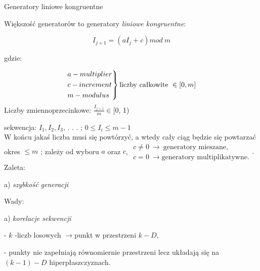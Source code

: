     \begin{frame}{Generatory liniowe kongruentne}

	Większość generatorów to generatory {\it liniowe kongruentne}:
	\begin{center}
 	$$I_{j+1} = (aI_{j}+c) mod\ m$$
	\end{center}
	gdzie:

    \[
    {\begin{rcases*}
	a - multiplier\\
	c - increment\\
	m - modulus
    \end{rcases*} \text{liczby całkowite} \ \in [0,m]}
    \]
    Liczby zmiennoprzecinkowe: $\displaystyle \frac{I_{j+1}}{m}\in[0$, 1)
    \newline
	\end{frame}
    \begin{frame}
	sekwencja: $I_{1}, I_{2}, I_{3}$, . . . ; $0\leq I_{i}\leq m-1$\\
	W końcu jakaś liczba musi się powtórzyć, a wtedy cały ciąg będzie się powtarzać\\
    okres $\leq m$ ; zależy od wyboru $a$ oraz  $c$, 
    $\begin{array}{l}
	c\neq 0\ \rightarrow\ \text{generatory mieszane},\\
	c=0\ \rightarrow \text{generatory multiplikatywne.}
	\end{array}.$\\

	Zaleta:

	a) {\it szybkość generacji}
	\newline

	Wady:

	a) {\it korelacje sekwencji}

	- $k$ -liczb losowych $\rightarrow$punkt w przestrzeni $k-D,$

	- punkty nie zapełniają równomiernie przestrzeni lecz układają się na $(k-1)-D$ hiperpłaszczyznach.\\

\end{frame}


